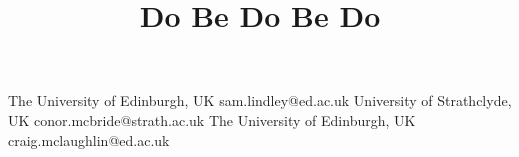 \documentclass{sigplanconf}
\begin{document}
\toappear{}



\title{Do Be Do Be Do}


           {The University of Edinburgh, UK}
           {sam.lindley@ed.ac.uk}
           {University of Strathclyde, UK}
           {conor.mcbride@strath.ac.uk}
           {The University of Edinburgh, UK}
           {craig.mclaughlin@ed.ac.uk}

\maketitle


\end{document}
